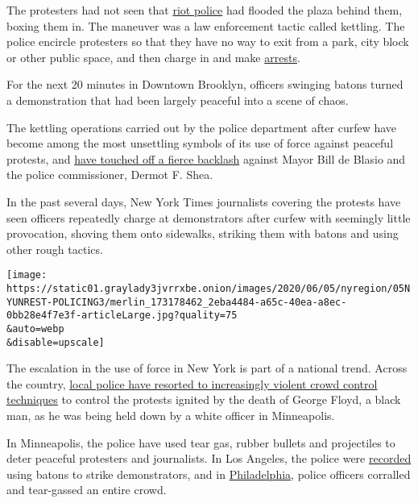 The protesters had not seen that
\href{https://www.nytimes3xbfgragh.onion/2020/07/17/us/portland-protests.html}{riot
police} had flooded the plaza behind them, boxing them in. The maneuver
was a law enforcement tactic called kettling. The police encircle
protesters so that they have no way to exit from a park, city block or
other public space, and then charge in and make
\href{https://www.nytimes3xbfgragh.onion/2020/07/17/us/portland-protests.html}{arrests}.

For the next 20 minutes in Downtown Brooklyn, officers swinging batons
turned a demonstration that had been largely peaceful into a scene of
chaos.

The kettling operations carried out by the police department after
curfew have become among the most unsettling symbols of its use of force
against peaceful protests, and
\href{https://www.nytimes3xbfgragh.onion/2020/06/04/nyregion/De-blasio-protests-curfew.html}{have
touched off a fierce backlash} against Mayor Bill de Blasio and the
police commissioner, Dermot F. Shea.

In the past several days, New York Times journalists covering the
protests have seen officers repeatedly charge at demonstrators after
curfew with seemingly little provocation, shoving them onto sidewalks,
striking them with batons and using other rough tactics.

\texttt{[image: https://static01.graylady3jvrrxbe.onion/images/2020/06/05/nyregion/05NYUNREST-POLICING3/merlin\_173178462\_2eba4484-a65c-40ea-a8ec-0bb28e4f7e3f-articleLarge.jpg?quality=75\\\&auto=webp\\\&disable=upscale]}

The escalation in the use of force in New York is part of a national
trend. Across the country,
\href{https://www.nytimes3xbfgragh.onion/2020/06/05/us/police-violence-george-floyd.html}{local
police have resorted to increasingly violent crowd control techniques}
to control the protests ignited by the death of George Floyd, a black
man, as he was being held down by a white officer in Minneapolis.

In Minneapolis, the police have used tear gas, rubber bullets and
projectiles to deter peaceful protesters and journalists. In Los
Angeles, the police were
\href{https://abc7.com/lapd-video-batons-protest/6231194/}{recorded}
using batons to strike demonstrators, and in
\href{https://whyy.org/articles/philly-police-say-tear-gas-used-because-676-protest-turned-hostile-but-theres-no-evidence-that-happened/}{Philadelphia},
police officers corralled and tear-gassed an entire crowd.

